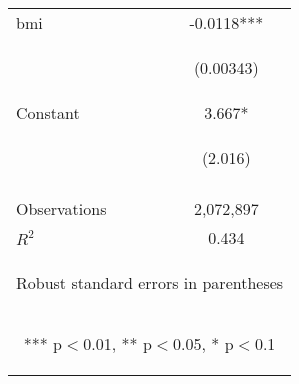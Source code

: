 \documentclass[]{article}
\begin{document}
\begin{center}
\begin{tabular}{lc}
bmi & -0.0118*** \\
\vspace{4pt} & \begin{footnotesize}(0.00343)\end{footnotesize} \\
Constant & 3.667* \\
 & \begin{footnotesize}(2.016)\end{footnotesize} \\
\vspace{4pt} & \begin{footnotesize}\end{footnotesize} \\
Observations & 2,072,897 \\
 $R^2$ & 0.434 \\ \hline
\multicolumn{2}{c}{\begin{footnotesize} Robust standard errors in parentheses\end{footnotesize}} \\
\multicolumn{2}{c}{\begin{footnotesize} *** p$<$0.01, ** p$<$0.05, * p$<$0.1\end{footnotesize}} \\
\end{tabular}
\end{center}
\end{document}
